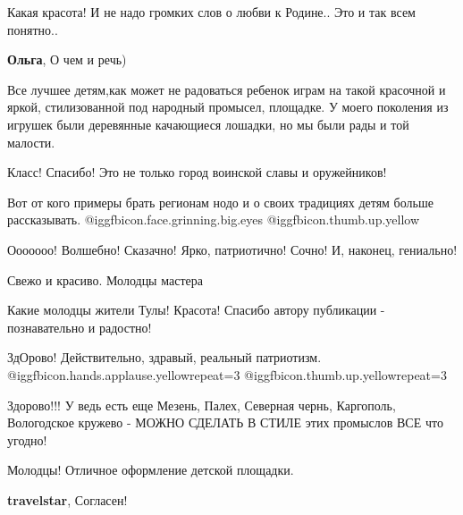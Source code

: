  
 
 
 
 
\zzSecCmt

\begin{itemize} %

Какая красота! И не надо громких слов о любви к Родине.. Это и так всем
понятно..

\textbf{Ольга}, О чем и речь)


Все лучшее детям,как может не радоваться ребенок играм на такой красочной и
яркой, стилизованной под народный промысел, площадке. У моего поколения из
игрушек были деревянные качающиеся лошадки, но мы были рады и той малости.


Класс! Спасибо! Это не только город воинской славы и оружейников!


Вот от кого примеры брать регионам нодо и о своих традициях детям больше
рассказывать.  @igg{fbicon.face.grinning.big.eyes}
@igg{fbicon.thumb.up.yellow} 


Ооооооо! Волшебно! Сказачно! Ярко, патриотично! Сочно! И, наконец, гениально!

Свежо и красиво. Молодцы мастера


Какие молодцы жители Тулы! Красота! Спасибо автору публикации - познавательно и радостно!


ЗдОрово! Действительно, здравый, реальный патриотизм.
@igg{fbicon.hands.applause.yellow}{repeat=3}
@igg{fbicon.thumb.up.yellow}{repeat=3} 


Здорово!!! У ведь есть еще Мезень, Палех, Северная чернь, Каргополь,
Вологодское кружево - МОЖНО СДЕЛАТЬ В СТИЛЕ этих промыслов ВСЕ что угодно!


Молодцы! Отличное оформление детской площадки.

\textbf{travelstar}, Согласен!

\end{itemize} %
